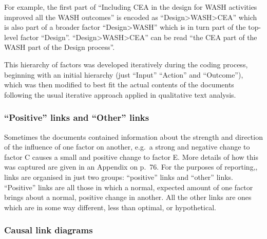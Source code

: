 \documentclass[
]{book}
\begin{document}
For example, the first part of ``Including CEA in the design for WASH activities improved all the WASH
outcomes'' is encoded as ``Design\textgreater WASH\textgreater CEA'' which is also part of a broader factor ``Design\textgreater WASH''
which is in turn part of the top-level factor ``Design''. ``Design\textgreater WASH\textgreater CEA'' can be read ``the CEA part of
the WASH part of the Design process''.

This hierarchy of factors was developed iteratively during the coding process, beginning
with an initial hierarchy (just ``Input'' ``Action'' and ``Outcome''), which was then modified
to best fit the actual contents of the documents following the usual iterative approach
applied in qualitative text analysis.

\hypertarget{positive-links-and-other-links}{%
\subsubsection{``Positive'' links and ``Other'' links}\label{positive-links-and-other-links}}

Sometimes the documents contained information about the strength and direction of the
influence of one factor on another, e.g.~a strong and negative change to factor C causes a
small and positive change to factor E. More details of how this was captured are given in
an Appendix on p.~76. For the purposes of reporting,, links are organised in just two
groups: ``positive'' links and ``other'' links. ``Positive'' links are all those in which a normal,
expected amount of one factor brings about a normal, positive change in another. All the
other links are ones which are in some way different, less than optimal, or hypothetical.

\hypertarget{causal-link-diagrams}{%
\subsubsection{Causal link diagrams}\label{causal-link-diagrams}}
\end{document}
